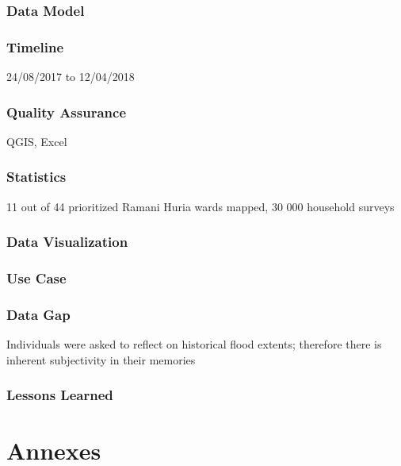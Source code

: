 \documentclass[a4paper,12pt,twoside]{article}
\begin{document}
\subsubsection{Data Model}

\subsubsection{Timeline}
24/08/2017 to 12/04/2018

\subsubsection{Quality Assurance}
QGIS, Excel

\subsubsection{Statistics}
11 out of 44 prioritized Ramani Huria wards mapped, 30 000 household surveys

\subsubsection{Data Visualization}

\subsubsection{Use Case}

\subsubsection{Data Gap}
Individuals were asked to reflect on historical flood extents; therefore there is inherent subjectivity in their memories

\subsubsection{Lessons Learned}

\newpage
\section{Annexes}
\end{document}
